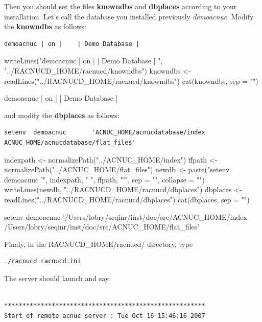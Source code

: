 \documentclass{article}
\begin{document}
Then you should set the files \textbf{knowndbs} and \textbf{dbplaces} according to your installation.
Let's call the database you installed previously \textit{demoacnuc}.
Modify  the \textbf{knowndbs} as follows:
\begin{verbatim}
demoacnuc | on |    | Demo Database | 
\end{verbatim}

\begin{Schunk}
\begin{Sinput}
 writeLines("demoacnuc | on |    | Demo Database | ", "../RACNUCD_HOME/racnucd/knowndbs")
 knowndbs <- readLines("../RACNUCD_HOME/racnucd/knowndbs")
 cat(knowndbs, sep = "\n")
\end{Sinput}
\begin{Soutput}
demoacnuc | on |    | Demo Database | 
\end{Soutput}
\end{Schunk}

and modify  the \textbf{dbplaces} as follows:

\begin{verbatim}
setenv  demoacnuc       'ACNUC_HOME/acnucdatabase/index ACNUC_HOME/acnucdatabase/flat_files'
\end{verbatim}

\begin{Schunk}
\begin{Sinput}
 indexpath <- normalizePath("../ACNUC_HOME/index")
 ffpath <- normalizePath("../ACNUC_HOME/flat_files")
 newdb <- paste("setenv demoacnuc '", indexpath, " ", ffpath, 
     "'", sep = "", collapse = "")
 writeLines(newdb, "../RACNUCD_HOME/racnucd/dbplaces")
 dbplaces <- readLines("../RACNUCD_HOME/racnucd/dbplaces")
 cat(dbplaces, sep = "\n")
\end{Sinput}
\begin{Soutput}
setenv demoacnuc '/Users/lobry/seqinr/inst/doc/src/ACNUC_HOME/index /Users/lobry/seqinr/inst/doc/src/ACNUC_HOME/flat_files'
\end{Soutput}
\end{Schunk}

Finaly, in the RACNUCD\_HOME/racnucd/ directory, type
\begin{verbatim}
./racnucd racnucd.ini
\end{verbatim}

The server should launch and say:
\begin{verbatim}

*******************************************************
Start of remote acnuc server : Tue Oct 16 15:46:16 2007

\end{verbatim}
\end{document}
